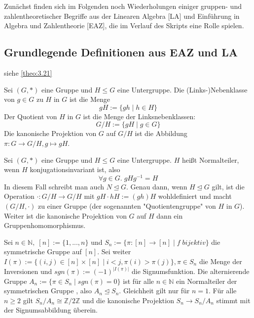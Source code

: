 \documentclass[../main.tex]{subfiles}
\begin{document}
Zunächst finden sich im Folgenden noch Wiederholungen einiger gruppen- und zahlentheoretischer Begriffe aus der Linearen Algebra [LA] und Einführung in Algebra und Zahlentheorie [EAZ], die im Verlauf des Skripts eine Rolle spielen.

\subsection{Grundlegende Definitionen aus EAZ und LA}

\begin{definition}[Radikal] siehe \ref{theo:3.21}
\end{definition}
\begin{definition}
    Sei $(G, *)$ eine Gruppe und $H \leq G$ eine Untergruppe. Die (Links-)Nebenklasse von $g \in G$ zu $H$ in $G$ ist die Menge $$gH := \{gh \mid h \in H\}$$
    Der Quotient von $H$ in $G$ ist die Menge der Linksnebenklassen:
    $$G/H := \{gH \mid g \in G\}$$
    Die kanonische Projektion von $G$ auf $G/H$ ist die Abbildung $\pi: G \rightarrow G/H, g \mapsto gH$.
\end{definition}
\begin{definition}
Sei $(G, *)$ eine Gruppe und $H \leq G$ eine Untergruppe. $H$ heißt Normalteiler, wenn $H$ konjugationsinvariant ist, also
$$\forall g \in G. \; gHg^{-1} = H$$
In diesem Fall schreibt man auch $N \trianglelefteq G$.
Genau dann, wenn $H \trianglelefteq G$ gilt, ist die Operation $\cdot: G/H \rightarrow G/H$ mit $gH \cdot hH := (gh)H$ wohldefiniert und macht $(G/H, \cdot)$ zu einer Gruppe (der sogenannten "Quotientengruppe" von $H$ in $G$). Weiter ist die kanonische Projektion von $G$ auf $H$ dann ein Gruppenhomomorphismus.
\end{definition}
\begin{example}
Sei $n \in \mathbb{N}, \; [n] := \{1,...,n\}$ und $S_n := \{\pi: [n] \rightarrow [n] \mid f \; bijektiv\}$ die symmetrische Gruppe auf $[n]$. Sei weiter $I(\pi) := \{(i,j) \in [n] \times [n] \mid i < j, \pi(i) > \pi(j)\}, \pi \in S_n$ die Menge der Inversionen und $sgn(\pi) := (-1)^{|I(\pi)|}$ die Signumsfunktion. Die alternierende Gruppe $A_n := \{\pi \in S_n \mid sgn(\pi) = 0\}$ ist für alle $n \in \mathbb{N}$ ein Normalteiler der symmetrischen Gruppe , also $A_n \trianglelefteq S_n$. Gleichheit gilt nur für $n = 1$.
Für alle $n \geq 2$  gilt $S_n/A_n \cong \mathbb{Z}/2\mathbb{Z}$ und die kanonische Projektion $S_n \rightarrow S_n/A_n$ stimmt mit der Signumsabbildung überein.
\end{example}
\end{document}
